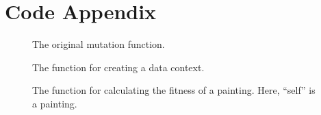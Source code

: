 %
%

\chapter{Code Appendix}


\begin{figure}
    \caption{The original mutation function.}
    \begin{singlespacing} 
    \begin{small}
    
    \end{small}
    \end{singlespacing}
    \label{fig:origmutation}
\end{figure}



\begin{figure}
    \caption{The function for creating a data context.}
    \begin{singlespacing} 
    \begin{small}
    
    \end{small}
    \end{singlespacing}
    \label{fig:newdatacontext}
\end{figure}

\begin{figure}
    \caption{The function for calculating the fitness of a painting. Here, ``self'' is a painting.}
    \begin{singlespacing} 
    \begin{small}
    
    \end{small}
    \end{singlespacing}
    \label{fig:fitnesscode}
\end{figure}

